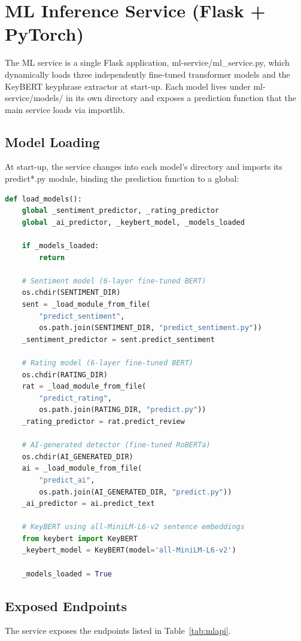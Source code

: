 \documentclass[12pt,a4paper,oneside]{report}
\renewcommand{\texttt}[1]{%
  {\ttfamily\hyphenchar\font=45\relax #1}}
\begin{document}
\section{ML Inference Service (Flask + PyTorch)}
The ML service is a single Flask application,
\texttt{ml-service/ml\_service.py}, which dynamically loads three
independently fine-tuned transformer models and the KeyBERT keyphrase
extractor at start-up. Each model lives under \texttt{ml-service/models/}
in its own directory and exposes a prediction function that the main
service loads via \texttt{importlib}.

\subsection{Model Loading}
At start-up, the service changes into each model's directory and
imports its \texttt{predict*.py} module, binding the prediction
function to a global:

\begin{lstlisting}[language=Python,caption={Model loader skeleton (\texttt{ml\_service.py})},label={lst:mlloader}]
def load_models():
    global _sentiment_predictor, _rating_predictor
    global _ai_predictor, _keybert_model, _models_loaded

    if _models_loaded:
        return

    # Sentiment model (6-layer fine-tuned BERT)
    os.chdir(SENTIMENT_DIR)
    sent = _load_module_from_file(
        "predict_sentiment",
        os.path.join(SENTIMENT_DIR, "predict_sentiment.py"))
    _sentiment_predictor = sent.predict_sentiment

    # Rating model (6-layer fine-tuned BERT)
    os.chdir(RATING_DIR)
    rat = _load_module_from_file(
        "predict_rating",
        os.path.join(RATING_DIR, "predict.py"))
    _rating_predictor = rat.predict_review

    # AI-generated detector (fine-tuned RoBERTa)
    os.chdir(AI_GENERATED_DIR)
    ai = _load_module_from_file(
        "predict_ai",
        os.path.join(AI_GENERATED_DIR, "predict.py"))
    _ai_predictor = ai.predict_text

    # KeyBERT using all-MiniLM-L6-v2 sentence embeddings
    from keybert import KeyBERT
    _keybert_model = KeyBERT(model='all-MiniLM-L6-v2')

    _models_loaded = True
\end{lstlisting}

\subsection{Exposed Endpoints}
The service exposes the endpoints listed in Table~\ref{tab:mlapi}.
\end{document}
